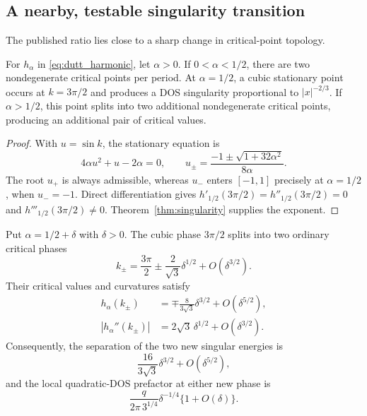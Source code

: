 \documentclass[11pt]{amsart}
\numberwithin{equation}{section}\setcounter{tocdepth}{3}\setcounter{secnumdepth}{3}
\begin{document}
\subsection{A nearby, testable singularity transition}\label{subsec:dutt_threshold}
The published ratio lies close to a sharp change in critical-point topology.
\begin{proposition}\label{prop:dutt_threshold}
For $h_\alpha$ in \eqref{eq:dutt_harmonic}, let $\alpha>0$.  If
$0<\alpha<1/2$, there are two nondegenerate critical points per period.  At
$\alpha=1/2$, a cubic stationary point occurs at $k=3\pi/2$ and produces a DOS
singularity proportional to $|x|^{-2/3}$.  If $\alpha>1/2$, this point splits into
two additional nondegenerate critical points, producing an additional pair of critical
values.
\end{proposition}
\begin{proof}
With $u=\sin k$, the stationary equation is
\begin{equation}
 4\alpha u^2+u-2\alpha=0,\qquad
 u_\pm=\frac{-1\pm\sqrt{1+32\alpha^2}}{8\alpha}.
\label{eq:dutt_stationary_roots}
\end{equation}
The root $u_+$ is always admissible, whereas $u_-$ enters $[-1,1]$ precisely at
$\alpha=1/2$, when $u_-=-1$.  Direct differentiation gives
$h'_{1/2}(3\pi/2)=h''_{1/2}(3\pi/2)=0$ and
$h'''_{1/2}(3\pi/2)\ne0$.  Theorem~\ref{thm:singularity} supplies the exponent.
\end{proof}
\begin{proposition}
\label{prop:dutt_cubic_unfolding}
Put $\alpha=1/2+\delta$ with $\delta>0$.  The cubic phase $3\pi/2$ splits into
two ordinary critical phases
\begin{equation}
 k_\pm=\frac{3\pi}{2}\pm\frac{2}{\sqrt3}\delta^{1/2}
       +O(\delta^{3/2}).
 \label{eq:dutt_split_phases}
\end{equation}
Their critical values and curvatures satisfy
\begin{align}
 h_\alpha(k_\pm)
 &=\mp\frac{8}{3\sqrt3}\delta^{3/2}+O(\delta^{5/2}),
 \label{eq:dutt_split_energies}\\
 |h_\alpha''(k_\pm)|
 &=2\sqrt3\,\delta^{1/2}+O(\delta^{3/2}).
 \label{eq:dutt_split_curvatures}
\end{align}
Consequently, the separation of the two new singular energies is
\begin{equation}
 \frac{16}{3\sqrt3}\delta^{3/2}+O(\delta^{5/2}),
 \label{eq:dutt_energy_resolution_scale}
\end{equation}
and the local quadratic-DOS prefactor at either new phase is
\begin{equation}
 \frac{q}{2\pi\,3^{1/4}}\delta^{-1/4}\{1+O(\delta)\}.
 \label{eq:dutt_prefactor_unfolding}
\end{equation}
\end{proposition}
\end{document}
